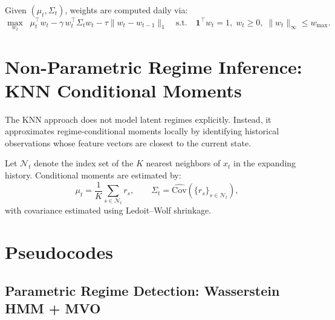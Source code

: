 \documentclass[11pt]{article}
\begin{document}
Given $(\mu_t,\Sigma_t)$, weights are computed daily via:
\[
\max_{w_t} \;\; \mu_t^\top w_t - \gamma\, w_t^\top \Sigma_t w_t - \tau \|w_t-w_{t-1}\|_1
\quad \text{s.t.}\quad \mathbf{1}^\top w_t=1,\; w_t\ge 0,\; \|w_t\|_\infty \le w_{\max}.
\]

\section{Non-Parametric Regime Inference: KNN Conditional Moments}
\label{sec:knn}

The KNN approach does not model latent regimes explicitly.
Instead, it approximates regime-conditional moments locally by identifying historical observations whose feature vectors are closest to the current state.

Let $\mathcal{N}_t$ denote the index set of the $K$ nearest neighbors of $x_t$ in the expanding history.
Conditional moments are estimated by:
\[
\mu_t = \frac{1}{K} \sum_{s \in \mathcal{N}_t} r_s,
\qquad
\Sigma_t = \widehat{\mathrm{Cov}}\left(\{r_s\}_{s \in \mathcal{N}_t}\right),
\]
with covariance estimated using Ledoit--Wolf shrinkage.

\section{Pseudocodes}

\subsection{Parametric Regime Detection: Wasserstein HMM + MVO}
\label{subsec:parametric_pseudocode}
\end{document}
